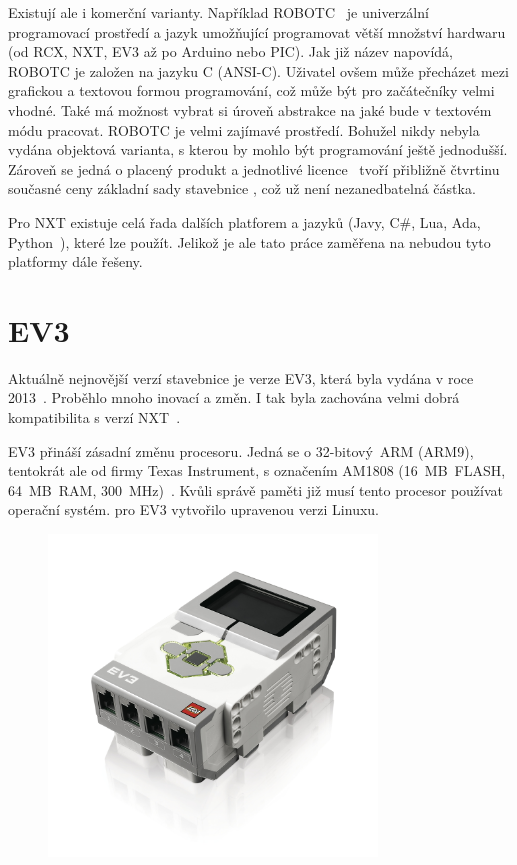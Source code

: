 Existují ale i komerční varianty. 
Například ROBOTC~\cite{legoProgramingPlatform_ROBOTC} je univerzální programovací prostředí a jazyk umožňující programovat větší množství hardwaru (od \legoM{ }RCX, NXT, EV3 až po Arduino nebo PIC). 
Jak již název napovídá, ROBOTC je založen na jazyku C (ANSI-C).
Uživatel ovšem může přecházet mezi grafickou a textovou formou programování, což může být pro začátečníky velmi vhodné.
Také má možnost vybrat si úroveň abstrakce na jaké bude v textovém módu pracovat.  
ROBOTC je velmi zajímavé prostředí. Bohužel nikdy nebyla vydána objektová varianta, s kterou by mohlo být programování ještě jednodušší. 
Zároveň se jedná o placený produkt a jednotlivé licence~\cite{legoProgramingPlatform_ROBOTC-price} tvoří přibližně čtvrtinu současné ceny základní sady stavebnice \legoEV{~}\cite{lego_eduxeEshop_CoreSet}, což už není nezanedbatelná částka.

Pro NXT existuje celá řada dalších platforem a jazyků (Javy, C\#, Lua, Ada, Python~\cite{legoMindstormsNXT_Programming}), které lze použít. 
Jelikož je ale tato práce zaměřena na \legoEV{ } nebudou tyto platformy dále řešeny. 


\section{\legoM{ }EV3}

Aktuálně nejnovější verzí stavebnice \legoM{ }je verze EV3, která byla vydána v roce 2013~\cite{lego_mindstormsHistory}. 
Proběhlo mnoho inovací a změn. 
I tak byla zachována velmi dobrá kompatibilita s verzí NXT~\cite{legoRobotSquare_EV3-and-NXT-compatibility}.

EV3 přináší zásadní změnu procesoru. 
Jedná se o 32-bitový~ARM (ARM9), tentokrát ale od firmy Texas Instrument, s označením AM1808 (16~MB~FLASH, 64~MB~RAM, 300~MHz)~\cite{legoMindstormsEV3_fw-dev-kit}. 
Kvůli správě paměti již musí tento procesor používat operační systém. %
\lego{ }pro EV3 vytvořilo upravenou verzi Linuxu. 

\begin{figure}[h]
	\centering
	\includegraphics[width=330px]{images/lego-mindstorms-ev3_brick.jpg}
	\caption[]{\legoEV{ \brick}\protect\footnotemark}
	\label{fig:lego-mindstorms-ev3_brick}
\end{figure}

